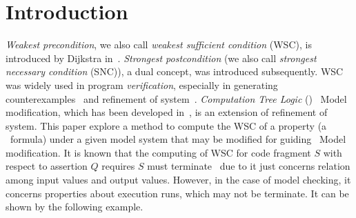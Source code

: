 \documentclass{article}
\begin{document}
\section{Introduction}
\emph{Weakest precondition}, we also call \emph{weakest sufficient condition} (WSC), is introduced by Dijkstra in~\cite{dijkstra1978guarded}.
\emph{Strongest postcondition} (we also call \emph{strongest necessary condition} (SNC)), a dual concept, was introduced subsequently.
WSC was widely used in program \emph{verification}, especially in generating counterexamples~\cite{dailler2018instrumenting} and refinement of  system~\cite{woodcock1990refinement}.
{\em Computation Tree Logic} (\CTL)~\cite{clarke1981design} Model modification, which has been developed in~\cite{ramdani2019r,martinez2016ctl,ding2006ctl}, is an extension of refinement of system.
This paper explore a method to compute the WSC of a property (a \CTL\ formula) under a given model system that may be modified for guiding \CTL\ Model modification.
It is known that the computing of WSC for code fragment $S$ with respect to assertion $Q$  requires $S$  must terminate~\cite{tremblay1996logic} due to it just concerns relation among input values and output values.
However, in the case of model checking, it concerns properties about execution runs, which may not be terminate.
It can be shown by the following example.
\end{document}
